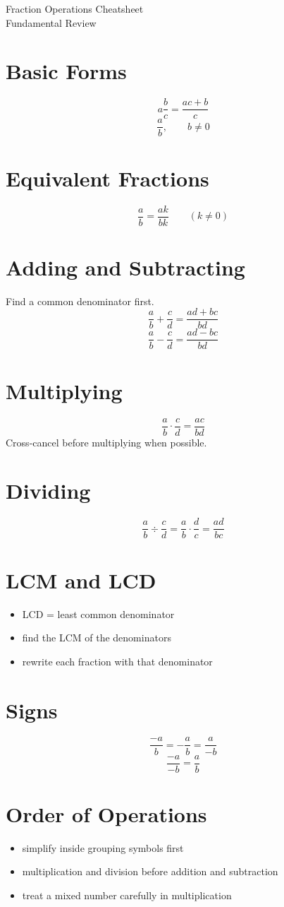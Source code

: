 \documentclass[11pt]{article}
\begin{document}
\begin{center}
{\LARGE Fraction Operations Cheatsheet}\\[0.4em]
{\large Fundamental Review}
\end{center}

\section*{Basic Forms}
\[
a\frac{b}{c}=\frac{ac+b}{c}
\]
\[
\frac{a}{b},\qquad b\ne 0
\]

\section*{Equivalent Fractions}
\[
\frac{a}{b}=\frac{ak}{bk}\qquad (k\ne 0)
\]

\section*{Adding and Subtracting}
Find a common denominator first.
\[
\frac{a}{b}+\frac{c}{d}=\frac{ad+bc}{bd}
\]
\[
\frac{a}{b}-\frac{c}{d}=\frac{ad-bc}{bd}
\]

\section*{Multiplying}
\[
\frac{a}{b}\cdot \frac{c}{d}=\frac{ac}{bd}
\]
Cross-cancel before multiplying when possible.

\section*{Dividing}
\[
\frac{a}{b}\div \frac{c}{d}=\frac{a}{b}\cdot \frac{d}{c}=\frac{ad}{bc}
\]

\section*{LCM and LCD}
\begin{itemize}
  \item LCD = least common denominator
  \item find the LCM of the denominators
  \item rewrite each fraction with that denominator
\end{itemize}

\section*{Signs}
\[
\frac{-a}{b}=-\frac{a}{b}=\frac{a}{-b}
\]
\[
\frac{-a}{-b}=\frac{a}{b}
\]

\section*{Order of Operations}
\begin{itemize}
  \item simplify inside grouping symbols first
  \item multiplication and division before addition and subtraction
  \item treat a mixed number carefully in multiplication
\end{itemize}
\end{document}
